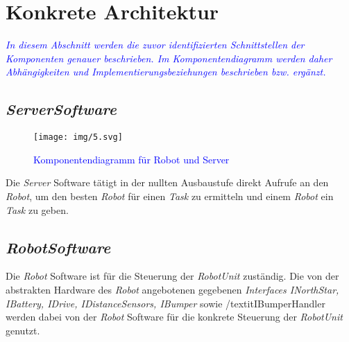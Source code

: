 \section{Konkrete Architektur}
\textcolor{blue}{\textit{In diesem Abschnitt werden die zuvor identifizierten Schnittstellen der Komponenten genauer beschrieben. Im Komponentendiagramm werden daher Abhängigkeiten und Implementierungsbeziehungen beschrieben bzw. ergänzt.
}}
\subsection{\textit{ServerSoftware}}
\begin{figure}[H]
\centering
\texttt{[image: img/5.svg]}
\caption{\textcolor{blue}{Komponentendiagramm für Robot und Server}}
\label{KomponentendiagrammKonkret}
\end{figure}
Die \textit{Server} Software tätigt in der nullten Ausbaustufe direkt Aufrufe an den \textit{Robot}, 
um den besten \textit{Robot} für einen \textit{Task} zu ermitteln und einem \textit{Robot} ein \textit{Task} zu geben.

\subsection{\textit{RobotSoftware}}

Die \textit{Robot} Software ist für die Steuerung der \textit{RobotUnit} zuständig. Die von der abstrakten Hardware 
des \textit{Robot} angebotenen gegebenen \textit{Interfaces INorthStar, IBattery, IDrive, IDistanceSensors, IBumper} sowie 
/textit{IBumperHandler} werden dabei von der \textit{Robot} Software für die konkrete Steuerung der \textit{RobotUnit} genutzt.
